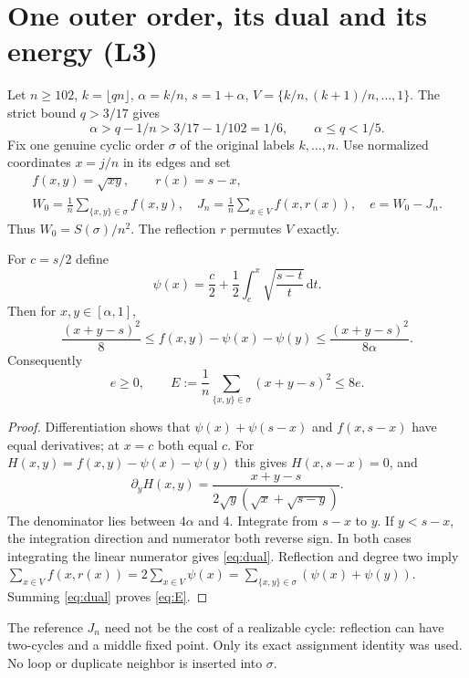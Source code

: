 \documentclass[review,supplement,hidelinks,onefignum,onetabnum]{siamart251216}
\newcommand{\dd}{\,\mathrm d}
\begin{document}
\section{One outer order, its dual and its energy (L3)}\label{sec:dual}
Let $n\ge102$, $k=\lfloor qn\rfloor$, $\alpha=k/n$, $s=1+\alpha$,
$V=\{k/n,(k+1)/n,\ldots,1\}$. The strict bound $q>3/17$ gives
\begin{equation}\label{eq:gridgate}
\alpha>q-1/n>3/17-1/102=1/6,\qquad \alpha\le q<1/5.
\end{equation}
Fix one genuine cyclic order $\sigma$ of the original labels $k,\ldots,n$.
Use normalized coordinates $x=j/n$ in its edges and set
\[
\begin{gathered}
f(x,y)=\sqrt{xy},\qquad r(x)=s-x,\\
W_0=\frac1n\sum_{\{x,y\}\in\sigma} f(x,y),\quad
J_n=\frac1n\sum_{x\in V} f(x,r(x)),\quad e=W_0-J_n.
\end{gathered}
\]
Thus $W_0=S(\sigma)/n^2$. The reflection $r$ permutes $V$ exactly.

\begin{lemma}\label{lem:dual}
For $c=s/2$ define
\[
\psi(x)=\frac c2+\frac12\int_c^x\sqrt{\frac{s-t}{t}}\dd t.
\]
Then for $x,y\in[\alpha,1]$,
\begin{equation}\label{eq:dual}
\frac{(x+y-s)^2}{8}\le f(x,y)-\psi(x)-\psi(y)
\le\frac{(x+y-s)^2}{8\alpha}.
\end{equation}
Consequently
\begin{equation}\label{eq:E}
e\ge0,\qquad E:=\frac1n\sum_{\{x,y\}\in\sigma}(x+y-s)^2\le8e.
\end{equation}
\end{lemma}
\begin{proof}
Differentiation shows that $\psi(x)+\psi(s-x)$ and $f(x,s-x)$ have
equal derivatives; at $x=c$ both equal $c$. For
$H(x,y)=f(x,y)-\psi(x)-\psi(y)$ this gives $H(x,s-x)=0$, and
\[
\partial_yH(x,y)=
\frac{x+y-s}{2\sqrt y(\sqrt x+\sqrt{s-y})}.
\]
The denominator lies between $4\alpha$ and $4$. Integrate from $s-x$
to $y$. If $y<s-x$, the integration direction and numerator both
reverse sign. In both cases integrating the linear numerator gives
\eqref{eq:dual}. Reflection and degree two imply
$\sum_{x\in V}f(x,r(x))=2\sum_{x\in V}\psi(x)
=\sum_{\{x,y\}\in\sigma}(\psi(x)+\psi(y))$.
Summing \eqref{eq:dual} proves \eqref{eq:E}.
\end{proof}
The reference $J_n$ need not be the cost of a realizable cycle:
reflection can have two-cycles and a middle fixed point. Only its exact
assignment identity was used. No loop or duplicate neighbor is inserted
into $\sigma$.
\end{document}
